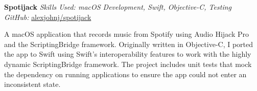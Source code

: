 \textbf{Spotijack}  \newline
\textit{Skills Used: macOS Development, Swift, Objective-C, Testing}\\
\textit{GitHub:} \href{https://github.com/\myweb/spotijack}{alexjohnj/spotijack}

A macOS application that records music from Spotify using Audio Hijack Pro and
the ScriptingBridge framework. Originally written in Objective-C, I ported the
app to Swift using Swift's interoperability features to work with the highly
dynamic ScriptingBridge framework. The project includes unit tests that mock the
dependency on running applications to ensure the app could not enter an
inconsistent state.

